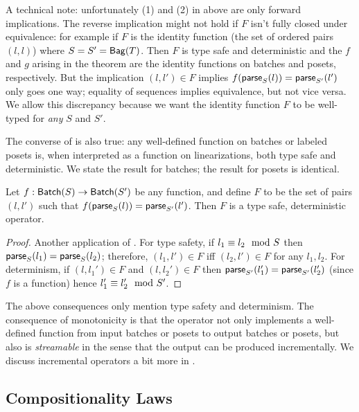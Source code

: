 A technical note: unfortunately (1) and (2) in  above are only forward implications.
The reverse implication might not hold if $F$ isn't fully closed under equivalence: for example if $F$ is the identity function (the set of ordered pairs $(l, l)$) where $S = S' = \relleaf{T}$. Then $F$ is type safe and deterministic and the $f$ and $g$ arising in the theorem are the identity functions on batches and posets, respectively. But the implication $(l, l') \in F$ implies $f(\parselin{l}{S}) = \parselin{l'}{S'}$ only goes one way; equality of sequences implies equivalence, but not vice versa.
We allow this discrepancy because we want the identity function $F$ to be well-typed for \emph{any} $S$ and $S'$.

The converse of  is also true: any well-defined function on batches or labeled posets is, when interpreted as a function on linearizations, both type safe and deterministic. We state the result for batches; the result for posets is identical.
\begin{theorem}
\label{thm:type-safe-and-deterministic-converse}
Let $f: \batch{S} \to \batch{S'}$ be any function, and define $F$
to be the set of pairs $(l, l')$ such that $f(\parselin{l}{S}) = \parselin{l'}{S'}$.
Then $F$ is a type safe, deterministic operator.
\end{theorem}
\begin{proof}
Another application of .
For type safety, if $\equivtype{l_1}{l_2}{S}$ then $\parselin{l_1}{S} = \parselin{l_2}{S}$; therefore, $(l_1, l') \in F$ iff $(l_2, l') \in F$ for any $l_1, l_2$.
For determinism, if $(l, l_1') \in F$ and $(l, l_2') \in F$ then $\parselin{l_1'}{S'} = \parselin{l_2'}{S'}$ (since $f$ is a function) hence $\equivtype{l_1'}{l_2'}{S'}$.
\end{proof}

The above consequences only mention type safety and determinism.
The consequence of monotonicity is that the operator not only implements a well-defined function from input batches or posets to output batches or posets, but also is \emph{streamable} in the sense that the output can be produced incrementally.
We discuss incremental operators a bit more in .

\subsection{Compositionality Laws}
\label{sec:compositionality-laws}

